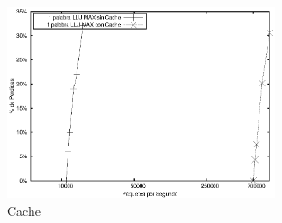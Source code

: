\begin{figure}[!h]
  \centering
	\includegraphics[width=0.7\textwidth]{5-resultados/graf/cachecomp.eps}
  \caption{Cache }
  \label{fig:cachecomp}
\end{figure}

